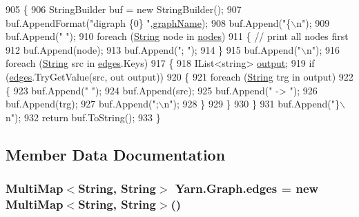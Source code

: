 \begin{DoxyCode}
905         \{
906             StringBuilder buf = \textcolor{keyword}{new} StringBuilder();
907             buf.AppendFormat(\textcolor{stringliteral}{"digraph \{0\} "},\hyperlink{a00105_a8605f1ec5a4e9cfd07d3ac2be042dac6}{graphName});
908             buf.Append(\textcolor{stringliteral}{"\{\(\backslash\)n"});
909             buf.Append(\textcolor{stringliteral}{"  "});
910             \textcolor{keywordflow}{foreach} (\hyperlink{a00050_a301aa7c866593a5b625a8fc158bbeacea27118326006d3829667a400ad23d5d98}{String} node \textcolor{keywordflow}{in} \hyperlink{a00105_a506df6f737a41748c01239bdea5d82b1}{nodes})
911             \{ \textcolor{comment}{// print all nodes first}
912                 buf.Append(node);
913                 buf.Append(\textcolor{stringliteral}{"; "});
914             \}
915             buf.Append(\textcolor{stringliteral}{"\(\backslash\)n"});
916             \textcolor{keywordflow}{foreach} (\hyperlink{a00050_a301aa7c866593a5b625a8fc158bbeacea27118326006d3829667a400ad23d5d98}{String} src \textcolor{keywordflow}{in} \hyperlink{a00105_a8adf7c937ab5c584b49698283e3da150}{edges}.Keys)
917             \{
918                 IList<string> \hyperlink{a00324_a3da6d48778c7b08a040bf24377f67792}{output};
919                 \textcolor{keywordflow}{if} (\hyperlink{a00105_a8adf7c937ab5c584b49698283e3da150}{edges}.TryGetValue(src, out output))
920                 \{
921                     \textcolor{keywordflow}{foreach} (\hyperlink{a00050_a301aa7c866593a5b625a8fc158bbeacea27118326006d3829667a400ad23d5d98}{String} trg \textcolor{keywordflow}{in} output)
922                     \{
923                         buf.Append(\textcolor{stringliteral}{"  "});
924                         buf.Append(src);
925                         buf.Append(\textcolor{stringliteral}{" -> "});
926                         buf.Append(trg);
927                         buf.Append(\textcolor{stringliteral}{";\(\backslash\)n"});
928                     \}
929                 \}
930             \}
931             buf.Append(\textcolor{stringliteral}{"\}\(\backslash\)n"});
932             \textcolor{keywordflow}{return} buf.ToString();
933         \}
\end{DoxyCode}


\subsection{Member Data Documentation}
\hypertarget{a00105_a8adf7c937ab5c584b49698283e3da150}{
\subsubsection[{edges}]{\setlength{\rightskip}{0pt plus 5cm}Multi\-Map$<${\bf String}, {\bf String}$>$ Yarn.\-Graph.\-edges = new Multi\-Map$<${\bf String}, {\bf String}$>$()}}\label{a00105_a8adf7c937ab5c584b49698283e3da150}


